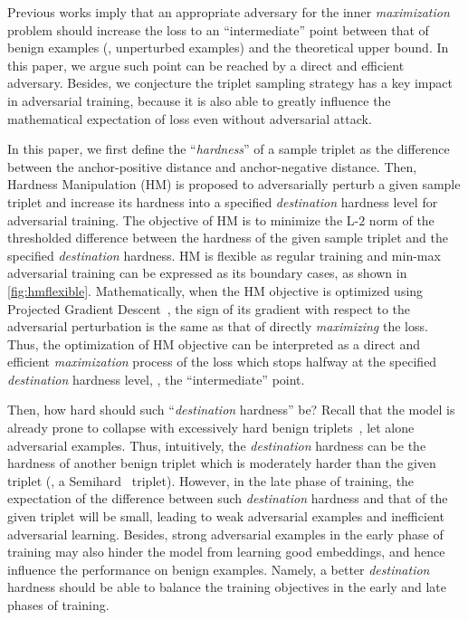 \documentclass[10pt,twocolumn,letterpaper]{article}
\begin{document}

Previous works imply that an appropriate adversary for the inner
\emph{maximization} problem should increase the loss to an ``intermediate''
point between that of benign examples (\ie, unperturbed examples) and the
theoretical upper bound.
%
In this paper, we argue such point can be reached by a direct and efficient
adversary.
%
Besides, we conjecture the triplet sampling strategy has a key impact in
adversarial training, because it is also able to greatly influence the
mathematical expectation of loss even without adversarial attack.


In this paper, we first define the ``\emph{hardness}'' of a sample triplet as
the difference between the anchor-positive distance and anchor-negative
distance.
%
Then, Hardness Manipulation (HM) is proposed to adversarially perturb a given
sample triplet and increase its hardness into a specified \emph{destination}
hardness level for adversarial training.
%
The objective of HM is to minimize the L-$2$ norm of the thresholded difference
between the hardness of the given sample triplet and the specified
\emph{destination} hardness.
%
HM is flexible as regular training and min-max adversarial training
can be expressed as its boundary cases, as shown in \cref{fig:hmflexible}.
%
Mathematically, when the HM objective is optimized using Projected Gradient
Descent~\cite{madry}, the sign of its gradient with respect to the adversarial
perturbation is the same as that of directly \emph{maximizing} the loss.
%
Thus, the optimization of HM objective can be interpreted as a direct and
efficient \emph{maximization} process of the loss which stops halfway at the
specified \emph{destination} hardness level, \ie, the ``intermediate'' point.


Then, how hard should such ``\emph{destination} hardness'' be?
%
Recall that the model is already prone to collapse with excessively hard benign
triplets~\cite{facenet}, let alone adversarial examples.
%
Thus, intuitively, the \emph{destination} hardness can be the hardness of
another benign triplet which is moderately harder than the given triplet (\eg,
a Semihard~\cite{facenet} triplet).
%
However, in the late phase of training, the expectation of the difference
between such \emph{destination} hardness and that of the given triplet will be
small, leading to weak adversarial examples and inefficient adversarial
learning.
%
Besides, strong adversarial examples in the early phase of training may also
hinder the model from learning good embeddings, and hence influence the
performance on benign examples.
%
Namely, a better \emph{destination} hardness should be able to balance the
training objectives in the early and late phases of training.
\end{document}
